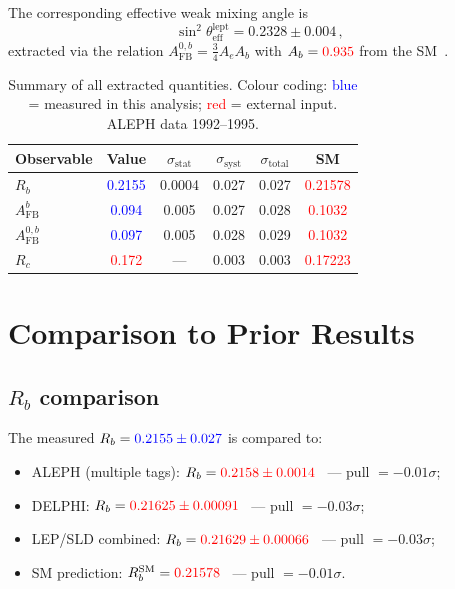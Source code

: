 \documentclass[11pt,a4paper]{article}
\newcommand{\measured}[1]{\textcolor{blue}{#1}}
\newcommand{\external}[1]{\textcolor{red}{#1}}
\begin{document}
The corresponding effective weak mixing angle is
\begin{equation}
  \sin^2\theta_\mathrm{eff}^\mathrm{lept} = 0.2328 \pm 0.004\,,
  \label{eq:sin2theta}
\end{equation}
extracted via the relation $A_\mathrm{FB}^{0,b} = \frac{3}{4} A_e A_b$
with $A_b = \external{0.935}$ from the SM~\cite{LEP:EWWG:2005}.

\begin{table}[htbp]
\centering
\caption{Summary of all extracted quantities.  Colour coding:
  \measured{blue} = measured in this analysis;
  \external{red} = external input.  ALEPH data 1992--1995.}
\label{tbl:all-results}
\begin{tabular}{lccccc}
\toprule
Observable & Value & $\sigma_\mathrm{stat}$ & $\sigma_\mathrm{syst}$ & $\sigma_\mathrm{total}$ & SM \\
\midrule
$R_b$ & \measured{0.2155} & 0.0004 & 0.027 & 0.027 & \external{0.21578} \\
$A_\mathrm{FB}^b$ & \measured{0.094} & 0.005 & 0.027 & 0.028 & \external{0.1032} \\
$A_\mathrm{FB}^{0,b}$ & \measured{0.097} & 0.005 & 0.028 & 0.029 & \external{0.1032} \\
$R_c$ & \external{0.172} & --- & 0.003 & 0.003 & \external{0.17223} \\
\bottomrule
\end{tabular}
\end{table}

\section{Comparison to Prior Results}
\label{sec:comparison}

\subsection{$R_b$ comparison}

The measured $R_b = \measured{0.2155 \pm 0.027}$ is compared to:
\begin{itemize}
\item ALEPH (multiple tags): $R_b = \external{0.2158 \pm 0.0014}$~\cite{ALEPH:Rb:1996} --- pull $= -0.01\sigma$;
\item DELPHI: $R_b = \external{0.21625 \pm 0.00091}$~\cite{DELPHI:Rb} --- pull $= -0.03\sigma$;
\item LEP/SLD combined: $R_b = \external{0.21629 \pm 0.00066}$~\cite{LEP:EWWG:2005} --- pull $= -0.03\sigma$;
\item SM prediction: $R_b^\mathrm{SM} = \external{0.21578}$~\cite{LEP:EWWG:2005} --- pull $= -0.01\sigma$.
\end{itemize}
\end{document}
